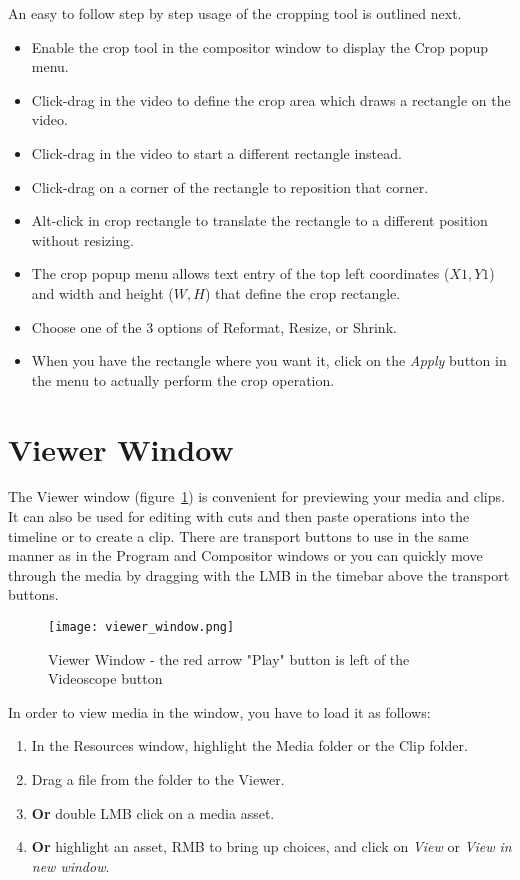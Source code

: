 An easy to follow step by step usage of the cropping tool is outlined next.
\begin{itemize}
    \item Enable the crop tool in the compositor window to display the Crop popup menu.
    \item Click-drag in the video to define the crop area which draws a rectangle on the video.
    \item Click-drag in the video to start a different rectangle instead.
    \item Click-drag on a corner of the rectangle to reposition that corner.
    \item Alt-click in crop rectangle to translate the rectangle to a different position without resizing.
    \item The crop popup menu allows text entry of the top left coordinates ($X1,Y1$) and width and
height ($W, H$) that define the crop rectangle. 
    \item Choose one of the 3 options of Reformat, Resize, or Shrink.
    \item When you have the rectangle where you want it,
click on the \emph{Apply} button in the menu to actually perform the crop operation.
\end{itemize}
 

\section{Viewer Window}%
\label{sec:viewer_window}

The Viewer window (figure~\ref{fig:viewer_window}) is convenient for previewing your media and 
clips. It can also be used for editing with cuts and then paste operations into the timeline or
to create a clip.  There are transport buttons to use in the same manner as in the Program
and Compositor windows or you can quickly move through the media by dragging with the LMB in
the timebar above the transport buttons.  

\begin{figure}[htpb]
    \centering
    \texttt{[image: viewer\_window.png]}
    \caption{Viewer Window - the red arrow "Play" button is left of the Videoscope button}
    \label{fig:viewer_window}
\end{figure}

In order to view media in the window, you have to load it as follows:

\begin{enumerate}
    \item  In the Resources window, highlight the Media folder or the Clip folder.
    \item  Drag a file from the folder to the Viewer.
    \item  \textbf{Or} double LMB click on a media asset.
    \item  \textbf{Or} highlight an asset, RMB to bring up choices, and click on \textit{View} or
\textit{View in new window}.
\end{enumerate}

